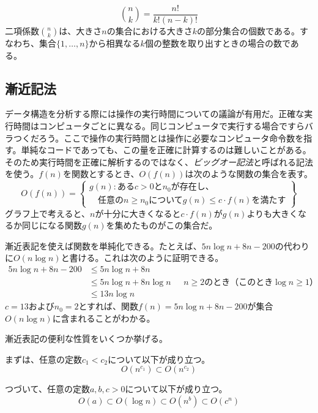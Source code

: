 \[
   \binom{n}{k} = \frac{n!}{k!(n-k)!}
\]
二項係数$\binom{n}{k}$は、大きさ$n$の集合における大きさ$k$の部分集合の個数である。すなわち、集合$\{1,\ldots,n\}$から相異なる$k$個の整数を取り出すときの場合の数である。 %

\subsection{漸近記法}

  
データ構造を分析する際には操作の実行時間についての議論が有用だ。正確な実行時間はコンピュータごとに異なる。同じコンピュータで実行する場合ですらバラつくだろう。ここで操作の実行時間とは操作に必要なコンピュータ命令数を指す。単純なコードであっても、この量を正確に計算するのは難しいことがある。そのため実行時間を正確に解析するのではなく、\emph{ビッグオー記法}と呼ばれる記法を使う。$f(n)$を関数とするとき、$O(f(n))$は次のような関数の集合を表す。
\[
   O(f(n)) = \left\{
     \begin{array}{l}
       g(n):\mbox{ある$c>0$と$n_0$が存在し、} \\
             \quad\mbox{任意の$n\ge n_0$について$g(n) \le c\cdot f(n)$を満たす}
     \end{array} \right\}
\]
グラフ上で考えると、$n$が十分に大きくなると$c\cdot f(n)$が$g(n)$よりも大きくなるか同じになる関数$g(n)$を集めたものがこの集合だ。 %

漸近表記を使えば関数を単純化できる。たとえば、$5n\log n + 8n - 200$の代わりに$O(n \log n)$と書ける。これは次のように証明できる。
\begin{align*}
       5n\log n + 8n - 200
        & \le 5n\log n + 8n \\
        & \le 5n\log n + 8n\log n & \mbox{ $n\ge 2$のとき（このとき$\log n \ge 1$）}
            \\
        & \le 13n\log n
\end{align*}
$ c = 13 $および$ n_0 = 2 $とすれば、関数$ f(n)= 5n \log n + 8n-200 $が集合$ O(n \log n)$に含まれることがわかる。

漸近表記の便利な性質をいくつか挙げる。

まずは、任意の定数$c_1 < c_2$について以下が成り立つ。
\[ O(n^{c_1}) \subset O(n^{c_2}) \]

つづいて、任意の定数$ a, b, c> 0 $について以下が成り立つ。
\[ O(a) \subset O(\log n) \subset O(n^{b}) \subset O({c}^n) \]

